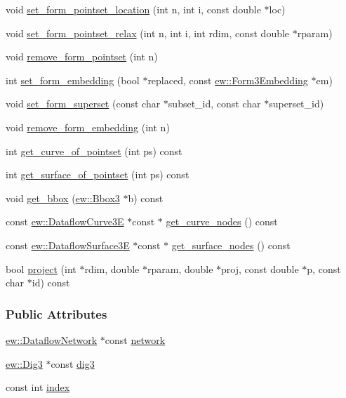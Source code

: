 \begin{DoxyCompactItemize}
void \hyperlink{classew_1_1Dig3Space_ac2e4e42bbb25f06d5ae344c6be3d541e}{set\_\-form\_\-pointset\_\-location} (int n, int i, const double $\ast$loc)
\item 
void \hyperlink{classew_1_1Dig3Space_aad83d1715297a4cc818db875cd61f967}{set\_\-form\_\-pointset\_\-relax} (int n, int i, int rdim, const double $\ast$rparam)
\item 
void \hyperlink{classew_1_1Dig3Space_ac7d8bdae1bf32ecdcc832e0144aa6efe}{remove\_\-form\_\-pointset} (int n)
\item 
int \hyperlink{classew_1_1Dig3Space_ae7204b1c52aea0f57725c5439946d0ec}{set\_\-form\_\-embedding} (bool $\ast$replaced, const \hyperlink{classew_1_1Form3Embedding}{ew::Form3Embedding} $\ast$em)
\item 
void \hyperlink{classew_1_1Dig3Space_a4724ad4460ab037c1473f2dc4004dfa8}{set\_\-form\_\-superset} (const char $\ast$subset\_\-id, const char $\ast$superset\_\-id)
\item 
void \hyperlink{classew_1_1Dig3Space_a12a7c818b711b266b46f50c6f84f7d4f}{remove\_\-form\_\-embedding} (int n)
\item 
int \hyperlink{classew_1_1Dig3Space_a83170563f07652019f67840a9adf4004}{get\_\-curve\_\-of\_\-pointset} (int ps) const 
\item 
int \hyperlink{classew_1_1Dig3Space_a236fdd1626f1a08873db9d7cf8b2a075}{get\_\-surface\_\-of\_\-pointset} (int ps) const 
\item 
void \hyperlink{classew_1_1Dig3Space_a0809a7797f05de87aee70dfc6de58322}{get\_\-bbox} (\hyperlink{classew_1_1Bbox3}{ew::Bbox3} $\ast$b) const 
\item 
const \hyperlink{classew_1_1DataflowCurve3E}{ew::DataflowCurve3E} $\ast$const $\ast$ \hyperlink{classew_1_1Dig3Space_ab2d954551601f184d1f415ac6998e49e}{get\_\-curve\_\-nodes} () const 
\item 
const \hyperlink{classew_1_1DataflowSurface3E}{ew::DataflowSurface3E} $\ast$const $\ast$ \hyperlink{classew_1_1Dig3Space_a58554373351ed520f4fbad1569b218b7}{get\_\-surface\_\-nodes} () const 
\item 
bool \hyperlink{classew_1_1Dig3Space_aadeb4f28cbecbdbc3a77b6a37bc40098}{project} (int $\ast$rdim, double $\ast$rparam, double $\ast$proj, const double $\ast$p, const char $\ast$id) const 
\end{DoxyCompactItemize}
\subsubsection*{Public Attributes}
\begin{DoxyCompactItemize}
\item 
\hyperlink{classew_1_1DataflowNetwork}{ew::DataflowNetwork} $\ast$const \hyperlink{classew_1_1Dig3Space_a9b0b4fe232f986990d036782ada68b7d}{network}
\item 
\hyperlink{classew_1_1Dig3}{ew::Dig3} $\ast$const \hyperlink{classew_1_1Dig3Space_adb69ce686a3d16df25a616a70ac82b7b}{dig3}
\item 
const int \hyperlink{classew_1_1Dig3Space_a00176cf8f95e7fe1ef6c0530f332ba7c}{index}
\end{DoxyCompactItemize}


